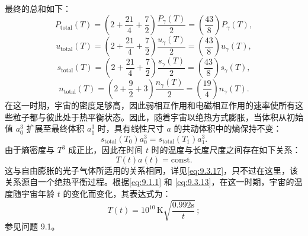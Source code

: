 最终的总和如下：
\begin{equation}\tag{9.3.12}\label{eq:9.3.12}
P _ { \mathrm { t o t a l } } ( T ) = \left( 2 + \frac { 21 } { 4 } + \frac { 7 } { 2 } \right) \frac { P _ { \gamma } ( T ) } { 2 } = \left( \frac { 43 } { 8 } \right) P _ { \gamma } ( T ) ,
\end{equation}
\begin{equation}\tag{9.3.13}\label{eq:9.3.13}
u _ { \mathrm { t o t a l } } ( T ) = \left( 2 + \frac { 21 } { 4 } + \frac { 7 } { 2 } \right) \frac { u _ { \gamma } ( T ) } { 2 } = \left( \frac { 43 } { 8 } \right) u _ { \gamma } ( T ) ,
\end{equation}
\begin{equation}\tag{9.3.14}\label{eq:9.3.14}
s _ { \mathrm { t o t a l } } ( T ) = \left( 2 + \frac { 21 } { 4 } + \frac { 7 } { 2 } \right) \frac { s _ { \gamma } ( T ) } { 2 } = \left( \frac { 43 } { 8 } \right) s _ { \gamma } ( T ) ,
\end{equation}
\begin{equation}\tag{9.3.15}\label{eq:9.3.15}
n _ { \mathrm { t o t a l } } ( T ) = \left( 2 + \frac { 9 } { 2 } + 3 \right) \frac { n _ { \gamma } ( T ) } { 2 } = \left( \frac { 19 } { 4 } \right) n _ { \gamma } ( T ) .
\end{equation}
在这一时期，宇宙的密度足够高，因此弱相互作用和电磁相互作用的速率使所有这些粒子都与彼此处于热平衡状态。因此，随着宇宙以绝热方式膨胀，当体积从初始值 \(a_{0}^{3}\) 扩展至最终体积 \(a_{1}^{3}\) 时，具有线性尺寸 \(a\) 的共动体积中的熵保持不变：
\begin{equation}\tag{9.3.16}\label{eq:9.3.16}
s _ { \mathrm { t o t a l } } ( T _ { 0 } ) a _ { 0 } ^{3} = s _ { \mathrm { t o t a l } } ( T _ { 1 } ) a _ { 1 } ^{3} .
\end{equation}
由于熵密度与 \(T^{3}\) 成正比，因此在时间 \(t\) 时的温度与长度尺度之间存在如下关系：
\begin{equation}\tag{9.3.17}\label{eq:9.3.17}
T ( t ) a ( t ) = \mathrm { c o n s t . }
\end{equation}
这与自由膨胀的光子气体所适用的关系相同，详见\autoref{eq:9.3.17}，只不过在这里，该关系源自一个绝热平衡过程。根据\autoref{eq:9.1.1} 和 \autoref{eq:9.3.13}，在这一时期，宇宙的温度随宇宙年龄 \(t\) 的变化而变化，其表达式为：
\begin{equation}\tag{9.3.18}\label{eq:9.3.18}
T ( t ) = 10 ^{10} \, \mathrm { K } \sqrt { \frac { 0 . 99 2 \mathrm { s } } { t } } \, ;
\end{equation}
参见问题 9.1。
